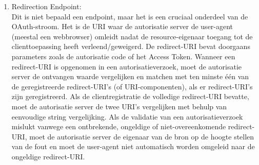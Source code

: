 \begin{enumerate}[label=\textbf{-}]
    \item Redirection Endpoint: \\
    Dit is niet bepaald een endpoint, maar het is een cruciaal onderdeel van de OAuth-stroom. Het is de URI waar de autorisatie server de user-agent (meestal een webbrowser) omleidt nadat de resource-eigenaar toegang tot de clienttoepassing heeft verleend/geweigerd. De redirect-URI bevat doorgaans parameters zoals de autorisatie code of het Access Token. Wanneer een redirect-URI is opgenomen in een autorisatieverzoek, moet de autorisatie server de ontvangen waarde vergelijken en matchen met ten minste één van de geregistreerde redirect-URI's (of URI-componenten), als er redirect-URI's zijn geregistreerd. Als de clientregistratie de volledige redirect-URI bevatte, moet de autorisatie server de twee URI's vergelijken met behulp van eenvoudige string vergelijking. Als de validatie van een autorisatieverzoek mislukt vanwege een ontbrekende, ongeldige of niet-overeenkomende redirect-URI, moet de autorisatie server de eigenaar van de bron op de hoogte stellen van de fout en moet de user-agent niet automatisch worden omgeleid naar de ongeldige redirect-URI.
  \end{enumerate}

